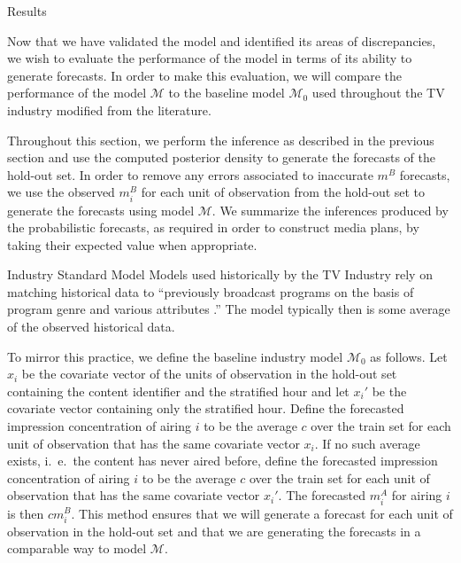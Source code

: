 \begin{chapter}{Results}

  Now that we have validated the model and identified its areas of discrepancies,
  we wish to evaluate the performance of the model in terms of its ability to
  generate forecasts. In order to make this evaluation, we will compare
  the performance of the model $\mathcal{M}$ to the baseline model $\mathcal{M}_0$
  used throughout the TV industry modified from the literature.

  Throughout this section, we perform the inference as described in the previous section
  and use the computed posterior density to generate the forecasts of the hold-out set.
  In order to remove any errors associated to inaccurate $m^B$ forecasts, we use the observed
  $m_i^B$ for each unit of observation from the hold-out set to generate the forecasts using model $\mathcal{M}$.
  We summarize the inferences produced by the probabilistic forecasts,
  as required in order to construct media plans, by taking their expected value when appropriate.

  \begin{section}{Industry Standard Model}
    Models used historically by the TV Industry rely on matching historical
    data to ``previously broadcast programs on the basis of program genre
    and various attributes \cite{tvforecasting}.'' The model typically then is some average of the observed historical data.

    To mirror this practice, we define the baseline industry model $\mathcal{M}_0$ as follows.
    Let $x_i$ be the covariate vector of the units of observation in the hold-out set
    containing the content identifier and the stratified hour and let $x_i'$ be the covariate vector
    containing only the stratified hour. Define the forecasted impression concentration
    of airing $i$ to be the average $c$ over the train set for each unit of observation that has the same covariate vector $x_i$.
    If no such average exists, i.\ e.\ the content has never aired before, define the
    forecasted impression concentration of airing $i$ to be the average $c$ over the train set for each unit of observation that has
    the same covariate vector $x_i'$. The forecasted $m_i^A$ for airing $i$ is then $c m_i^B $.
    This method ensures that we will generate a forecast for each unit of observation in the hold-out set
    and that we are generating the forecasts in a comparable way to model $\mathcal{M}$.
  \end{section}


\end{chapter}
